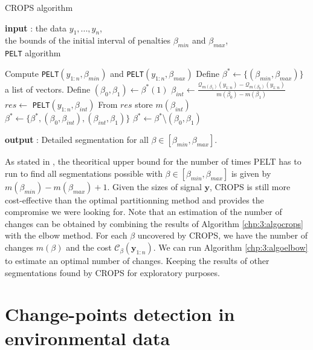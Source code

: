 \begin{algorithm}[ht]
\caption{CROPS algorithm}\label{chp:3:algocrops}
\begin{algorithmic}

\State \textbf{input} : the data $y_{1},...,y_{n}$, \\
the bounds of the initial interval of penalties $\beta_{min}$ and $\beta_{max}$, \\
\texttt{PELT} algorithm 
  
\State Compute \texttt{PELT}$(y_{1:n},\beta_{min})$ and \texttt{PELT}$(y_{1:n},\beta_{max})$ 
\State Define $\beta^* \gets \{(\beta_{min},\beta_{max})\}$ a list of vectors.  
\While{$\beta^*\neq \emptyset$}
  \State Define $(\beta_0, \beta_1) \gets \beta^*(1)$
    \State $\beta_{int} \gets \frac{\mathcal{Q}_{m(\beta_1)}(y_{1:n})-\mathcal{Q}_{m(\beta_0)}(y_{1:n})}{m(\beta_0)-m(\beta_1)}$
    \State $res \gets$ \texttt{PELT}$(y_{1:n},\beta_{int})$
    \State From $res$ store $m(\beta_{int})$
      \State $\beta^* \gets \{\beta^*,(\beta_0,\beta_{int}),(\beta_{int},\beta_1)\}$
    \EndIf
  \EndIf
  \State $\beta^* \gets \beta^*$\textbackslash$(\beta_0,\beta_1)$
\EndWhile 
   
\State \textbf{output} : Detailed segmentation for all $\beta \in [\beta_{min},\beta_{max}]$. 
\end{algorithmic}
\end{algorithm} 

As stated in \cite{haynes2017}, the theoritical upper bound for the number of times PELT has to run to find all segmentations possible with $\beta\in[\beta_{min},\beta_{max}]$ is given by $m(\beta_{min})-m(\beta_{max})+1$. Given the sizes of signal $\bm y$, CROPS is still more cost-effective than the optimal partitionning method and provides the compromise we were looking for. Note that an estimation of the number of changes can be obtained by combining the results of Algorithm  \ref{chp:3:algocrops} with the elbow method. For each $\beta$ uncovered by CROPS, we have the number of changes $m(\beta)$ and the cost $\mathcal{C}_{\beta}(\bm y_{1:n})$. We can run Algorithm \ref{chp:3:algoelbow} to estimate an optimal number of changes. Keeping the results of other segmentations found by CROPS for exploratory purposes. 

\section{Change-points detection in environmental data}\label{chp:3:4}

